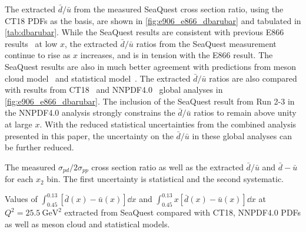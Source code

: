 \documentclass[reprint,aps,unsortedaddress,superscriptaddress,prl,floatfix,showpacs,linenumbers,final]{revtex4-2}
\begin{document}
The extracted $\bar{d}/\bar{u}$ from the measured SeaQuest cross section ratio,
using the CT18 PDFs as the basis, are shown in \cref{fig:e906_e866_dbarubar}
and tabulated in \cref{tab:dbarubar}.
While the SeaQuest results are consistent with previous E866 results~\cite{towell2001} at low $x$,
the extracted $\bar{d}/\bar{u}$ ratios from the SeaQuest measurement continue to rise as $x$ increases,
and is in tension with the E866 result.
The SeaQuest results are also in much better agreement with predictions from meson cloud model~\cite{alberg2022}
and statistical model~\cite{soffer2019}.
The extracted $\bar{d}/\bar{u}$ ratios are also compared with results from CT18~\cite{hou2021} and NNPDF4.0~\cite{ball2022a}
global analyses in \cref{fig:e906_e866_dbarubar}.
The inclusion of the SeaQuest result from Run 2-3 in the NNPDF4.0 analysis strongly constrains the $\bar{d}/\bar{u}$ ratios
to remain above unity at large $x$.
With the reduced statistical uncertainties from the combined analysis presented in this paper,
the uncertainty on the $\bar{d}/\bar{u}$ in these global analyses can be further reduced.

\begin{table}[htbp!]
	\centering
	\caption{The measured $\sigma_{pd}/2\sigma_{pp}$ cross section ratio as well
		as the extracted $\bar{d}/\bar{u}$ and $\bar{d}-\bar{u}$ for each $x_{2}$ bin.
		The first uncertainty is statistical and the second systematic.}
	\label{tab:dbarubar}
	\begin{adjustbox}{max width=\textwidth}
		
	\end{adjustbox}
\end{table}
\begin{table}[htbp!]
	\centering
	\caption{Values of $\int_{0.45}^{0.13} \left[\bar{d}\left(x\right) - \bar{u}\left(x\right)\right] \dd{x}$
		and $\int_{0.45}^{0.13} x\left[\bar{d}\left(x\right) - \bar{u}\left(x\right)\right] \dd{x}$ at $Q^2=\SI{25.5}{\GeV\squared}$ extracted from
		SeaQuest compared with CT18, NNPDF4.0 PDFs as well as meson cloud and statistical models.}
	\label{tab:dbarMubar}
	\begin{adjustbox}{max width=\textwidth}
		
	\end{adjustbox}
\end{table}
\end{document}
